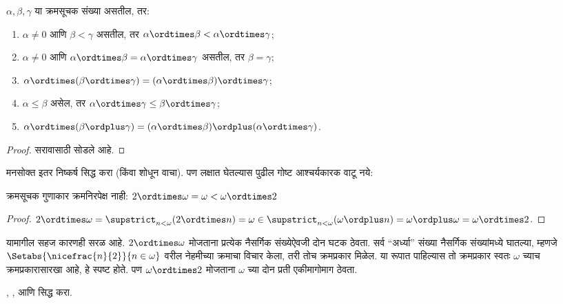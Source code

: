 \documentclass[../../../include/open-logic-section]{subfiles}
\begin{document}
\begin{lem}
$\alpha, \beta, \gamma$ या क्रमसूचक संख्या असतील, तर:
\begin{enumerate}
  \item{} $\alpha \neq 0$ आणि $\beta < \gamma$ असतील,
  तर $\alpha \ordtimes \beta < \alpha \ordtimes \gamma$;
  \item{} $\alpha \neq 0$ आणि $\alpha \ordtimes
  \beta = \alpha\ordtimes\gamma$ असतील, तर $\beta = \gamma$;
  \item{} $\alpha \ordtimes (\beta \ordtimes
  \gamma) = (\alpha \ordtimes \beta) \ordtimes \gamma$;
  \item{} $\alpha \leq \beta$ असेल, तर $\alpha
  \ordtimes \gamma \leq \beta \ordtimes \gamma$;
  \item{} $\alpha \ordtimes (\beta \ordplus
  \gamma) = (\alpha \ordtimes \beta )\ordplus (\alpha\ordtimes
  \gamma)$.
\end{enumerate}
\end{lem}

\begin{proof}
सरावासाठी सोडले आहे.
\end{proof}

मनसोक्त इतर निष्कर्ष सिद्ध करा (किंवा शोधून वाचा). पण  लक्षात घेतल्यास पुढील गोष्ट आश्चर्यकारक वाटू नये:

\begin{prop}
क्रमसूचक गुणाकार क्रमनिरपेक्ष नाही: $2 \ordtimes \omega  =
\omega < \omega \ordtimes 2$
\end{prop}

\begin{proof}
$2 \ordtimes \omega = \supstrict_{n < \omega}(2\ordtimes  n) = \omega \in \supstrict_{n < \omega}(\omega \ordplus n) = \omega \ordplus \omega = \omega \ordtimes 2$.
\end{proof}
\noindent
यामागील सहज कारणही सरळ आहे. $2
\ordtimes \omega$ मोजताना प्रत्येक नैसर्गिक संख्येऐवजी दोन घटक ठेवता. सर्व “अर्ध्या” संख्या नैसर्गिक संख्यांमध्ये घातल्या, म्हणजे $\Setabs{\nicefrac{n}{2}}{n \in \omega}$ वरील नेहमीच्या क्रमाचा विचार केला, तरी तोच क्रमप्रकार मिळेल. या रूपात पाहिल्यास तो क्रमप्रकार स्वतः $\omega$ च्याच क्रमप्रकारासारखा आहे, हे स्पष्ट होते. पण $\omega \ordtimes 2$ मोजताना $\omega$ च्या दोन प्रती एकीमागोमाग ठेवता.

\begin{prob}
,
,
आणि
सिद्ध करा.
\end{prob}
\end{document}
